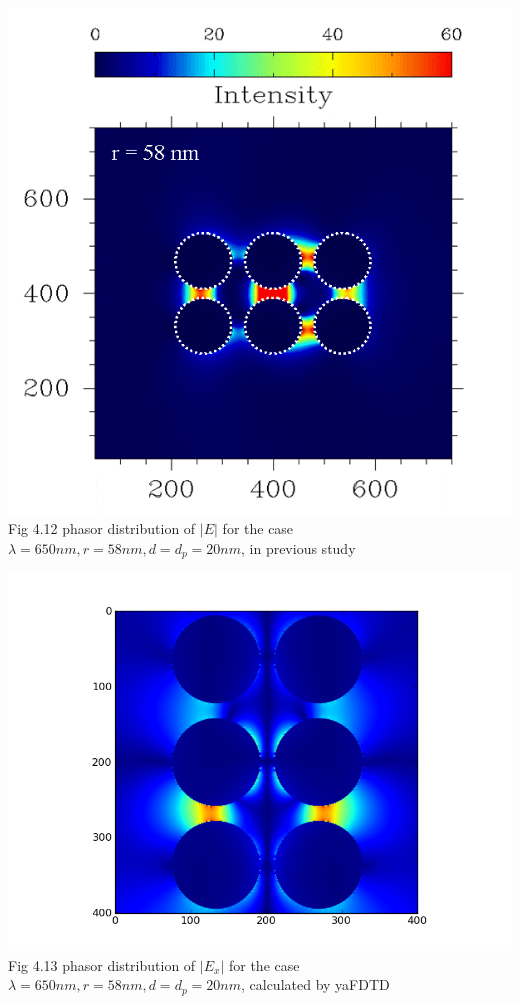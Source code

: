 \documentclass[openany]{book}
\begin{document}
\begin{center}
\includegraphics[scale=0.5]{images/r58.png}\\
Fig 4.12
phasor distribution of $|E|$ for the case $\lambda = 650nm, r = 58nm, d = d_p = 20nm$, in previous study
\end{center}

\begin{center}
\includegraphics[scale=0.8]{images/ex-r58.png}\\
Fig 4.13
phasor distribution of $|E_x|$ for the case $\lambda = 650nm, r = 58nm, d = d_p = 20nm$, calculated by yaFDTD
\end{center}
\end{document}
